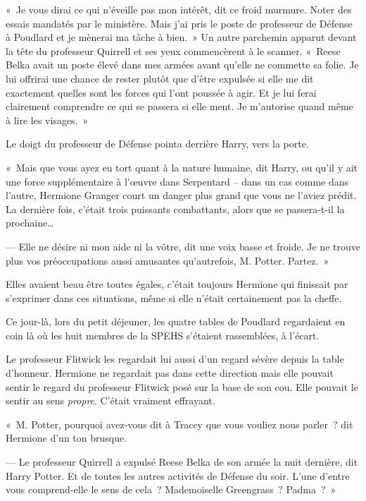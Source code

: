 «~Je vous dirai ce qui n'éveille pas mon intérêt, dit ce froid murmure.
Noter des essais mandatés par le ministère.
Mais j'ai pris le poste de professeur de Défense à Poudlard et je mènerai ma tâche à bien.~»
Un autre parchemin apparut devant la tête du professeur Quirrell et ses yeux commencèrent à le scanner.
«~Reese Belka avait un poste élevé dans mes armées avant qu'elle ne commette sa folie.
Je lui offrirai une chance de rester plutôt que d'être expulsée si elle me dit exactement quelles sont les forces qui l'ont poussée à agir.
Et je lui ferai clairement comprendre ce qui se passera si elle ment.
Je m'autorise quand même à lire les visages.~»

Le doigt du professeur de Défense pointa derrière Harry, vers la porte.

«~Mais que vous ayez eu tort quant à la nature humaine, dit Harry, ou qu'il y ait une force supplémentaire à l'œuvre dans Serpentard -- dans un cas comme dans l'autre, Hermione Granger court un danger plus grand que vous ne l'aviez prédit.
La dernière fois, c'était trois puissants combattants, alors que se passera-t-il la prochaine…

--- Elle ne désire ni mon aide ni la vôtre, dit une voix basse et froide.
Je ne trouve plus vos préoccupations aussi amusantes qu'autrefois, M. Potter.
Partez.~»

\later

Elles avaient beau être toutes égales, c'était toujours Hermione qui finissait par s'exprimer dans ces situations, même si elle n'était certainement pas la cheffe.

Ce jour-là, lors du petit déjeuner, les quatre tables de Poudlard regardaient en coin là où les huit membres de la SPEHS s'étaient rassemblées, à l'écart.

Le professeur Flitwick les regardait lui aussi d'un regard sévère depuis la table d'honneur.
Hermione ne regardait pas dans cette direction mais elle pouvait sentir le regard du professeur Flitwick posé sur la base de son cou.
Elle pouvait le sentir au sens \emph{propre}.
C'était vraiment effrayant.

«~M. Potter, pourquoi avez-vous dit à Tracey que vous vouliez nous parler~? dit Hermione d'un ton brusque.

--- Le professeur Quirrell a expulsé Reese Belka de son armée la nuit dernière, dit Harry Potter.
Et de toutes les autres activités de Défense du soir.
L'une d'entre vous comprend-elle le sens de cela~?
Mademoiselle Greengrass~?
Padma~?~»

